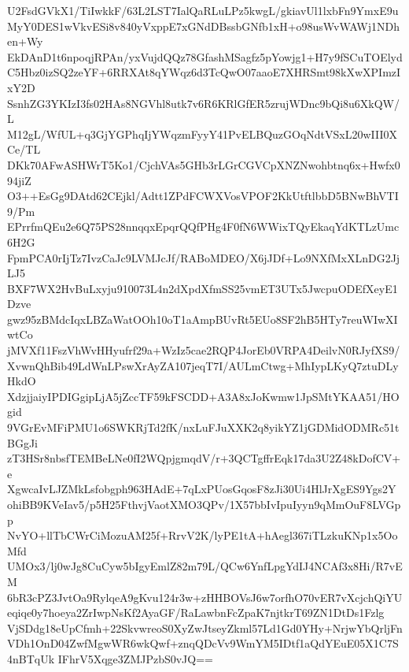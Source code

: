 U2FsdGVkX1/TiIwkkF/63L2LST7IalQaRLuLPz5kwgL/gkiavUl1lxbFn9YmxE9u
MyY0DES1wVkvESi8v840yVxppE7xGNdDBssbGNfb1xH+o98usWvWAWj1NDhen+Wy
EkDAnD1t6npoqjRPAn/yxVujdQQz78GfashMSagfz5pYowjg1+H7y9fSCuTOElyd
C5Hbz0izSQ2zeYF+6RRXAt8qYWqz6d3TcQwO07aaoE7XHRSmt98kXwXPImzIxY2D
SsnhZG3YKIzI3fs02HAs8NGVhl8utk7v6R6KRlGfER5zrujWDnc9bQi8u6XkQW/L
M12gL/WfUL+q3GjYGPhqIjYWqzmFyyY41PvELBQuzGOqNdtVSxL20wIII0XCe/TL
DKk70AFwASHWrT5Ko1/CjchVAs5GHb3rLGrCGVCpXNZNwohbtnq6x+Hwfx094jiZ
O3++EsGg9DAtd62CEjkl/Adtt1ZPdFCWXVosVPOF2KkUtftlbbD5BNwBhVTI9/Pm
EPrrfmQEu2e6Q75PS28nnqqxEpqrQQfPHg4F0fN6WWixTQyEkaqYdKTLzUmc6H2G
FpmPCA0rIjTz7IvzCaJc9LVMJcJf/RABoMDEO/X6jJDf+Lo9NXfMxXLnDG2JjLJ5
BXF7WX2HvBuLxyju910073L4n2dXpdXfmSS25vmET3UTx5JwcpuODEfXeyE1Dzve
gwz95zBMdcIqxLBZaWatOOh10oT1aAmpBUvRt5EUo8SF2hB5HTy7reuWIwXIwtCo
jMVXf11FszVhWvHHyufrf29a+WzIz5cae2RQP4JorEb0VRPA4DeilvN0RJyfXS9/
XvwnQhBib49LdWnLPswXrAyZA107jeqT7I/AULmCtwg+MhIypLKyQ7ztuDLyHkdO
XdzjjaiyIPDIGgipLjA5jZccTF59kFSCDD+A3A8xJoKwmw1JpSMtYKAA51/HOgid
9VGrEvMFiPMU1o6SWKRjTd2fK/nxLuFJuXXK2q8yikYZ1jGDMidODMRc51tBGgJi
zT3HSr8nbsfTEMBeLNe0fI2WQpjgmqdV/r+3QCTgffrEqk17da3U2Z48kDofCV+e
XgwcaIvLJZMkLsfobgph963HAdE+7qLxPUosGqosF8zJi30Ui4HlJrXgES9Ygs2Y
ohiBB9KVeIav5/p5H25FthvjVaotXMO3QPv/1X57bbIvIpuIyyn9qMmOuF8LVGpp
NvYO+llTbCWrCiMozuAM25f+RrvV2K/lyPE1tA+hAegl367iTLzkuKNp1x5OoMfd
UMOx3/lj0wJg8CuCyw5bIgyEmlZ82m79L/QCw6YnfLpgYdIJ4NCAf3x8Hi/R7vEM
6bR3cPZ3JvtOa9RylqeA9gKvu124r3w+zHHBOVsJ6w7orfhO70vER7vXcjchQiYU
eqiqe0y7hoeya2ZrIwpNsKf2AyaGF/RaLawbnFcZpaK7njtkrT69ZN1DtDs1Fzlg
VjSDdg18eUpCfmh+22SkvwreoS0XyZwJtseyZkml57Ld1Gd0YHy+NrjwYbQrljFn
VDh1OnD04ZwfMgwWR6wkQwf+znqQDcVv9WmYM5IDtf1aQdYEuE05X1C7S4nBTqUk
IFhrV5Xqge3ZMJPzbS0vJQ==
